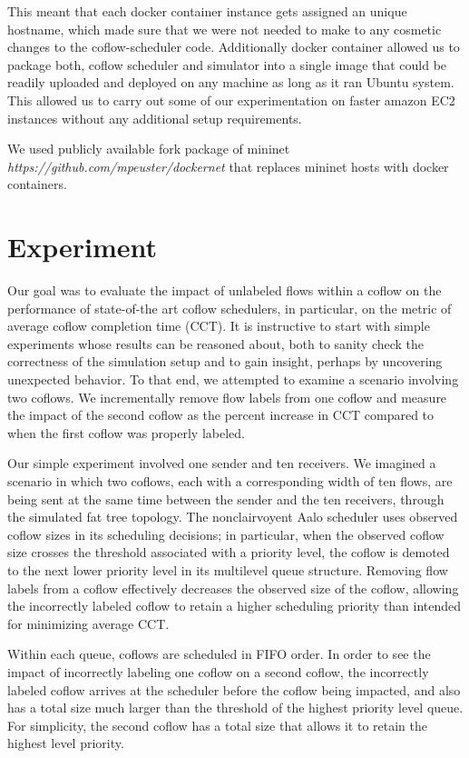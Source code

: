 \documentclass[conference]{IEEEtran}
\begin{document}
This meant that each docker container instance gets assigned an unique hostname, which made sure that we were not needed to make to any cosmetic changes to the coflow-scheduler code. Additionally  docker container allowed us to package both, coflow scheduler and simulator into a single image that could be readily uploaded and deployed on any machine as long as it ran Ubuntu system. This allowed us to carry out some of our experimentation on faster amazon EC2 instances without any additional setup requirements.

We used publicly available fork package of mininet \textit{https://github.com/mpeuster/dockernet}\cite{dockernet} that replaces mininet hosts with docker containers.

\section{Experiment}

Our goal was to evaluate the impact of unlabeled flows within a coflow on the performance of state-of-the art coflow schedulers, in particular, on the metric of average coflow completion time (CCT). It is instructive to start with simple experiments whose results can be reasoned about, both to sanity check the correctness of the simulation setup and to gain insight, perhaps by uncovering unexpected behavior. 
To that end, we attempted to examine a scenario involving two coflows. We incrementally remove flow labels from one coflow and measure the impact of the second coflow as the percent increase in CCT compared to when the first coflow was properly labeled.

Our simple experiment involved one sender and ten receivers. We imagined a scenario in which two coflows, each with a corresponding width of ten flows, are being sent at the same time between the sender and the ten receivers, through the simulated fat tree topology. The nonclairvoyent Aalo scheduler uses observed coflow sizes in its scheduling decisions; in particular, when the observed coflow size crosses the threshold associated with a priority level, the coflow is demoted to the next lower priority level in its multilevel queue structure. Removing flow labels from a coflow effectively decreases the observed size of the coflow, allowing the incorrectly labeled coflow to retain a higher scheduling priority than intended for minimizing average CCT.

Within each queue, coflows are scheduled in FIFO order. In order to see the impact of incorrectly labeling one coflow on a second coflow, the incorrectly labeled coflow arrives at the scheduler before the coflow being impacted, and also has a total size much larger than the threshold of the highest priority level queue. For simplicity, the second coflow has a total size that allows it to retain the highest level priority.
\end{document}
